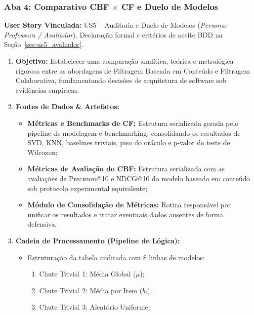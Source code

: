 \subsubsection{Aba 4: Comparativo CBF $\times$ CF e Duelo de Modelos}

\noindent\textbf{User Story Vinculada:} US5 -- Auditoria e Duelo de Modelos (\textit{Persona: Professora / Avaliador}).
Declaração formal e critérios de aceite BDD na Seção~\ref{sec:us5_avaliador}.

\begin{enumerate}[label=\textbf{\arabic*.}]
    \item \textbf{Objetivo:} Estabelecer uma comparação analítica, teórica e metrológica rigorosa entre as abordagens de Filtragem Baseada em Conteúdo e Filtragem Colaborativa, fundamentando decisões de arquitetura de software sob evidências empíricas.
    \item \textbf{Fontes de Dados \& Artefatos:}
    \begin{itemize}
        \item \textbf{Métricas e Benchmarks de CF:} Estrutura serializada gerada pelo pipeline de modelagem e benchmarking, consolidando os resultados de SVD, KNN, baselines triviais, piso do oráculo e p-valor do teste de Wilcoxon;
        \item \textbf{Métricas de Avaliação do CBF:} Estrutura serializada com as avaliações de Precision@10 e NDCG@10 do modelo baseado em conteúdo sob protocolo experimental equivalente;
        \item \textbf{Módulo de Consolidação de Métricas:} Rotina responsável por unificar os resultados e tratar eventuais dados ausentes de forma defensiva.
    \end{itemize}
    \item \textbf{Cadeia de Processamento (Pipeline de Lógica):}
    \begin{itemize}
        \item Estruturação da tabela auditada com 8 linhas de modelos:
        \begin{enumerate}[label=\roman*.]
            \item Chute Trivial 1: Média Global ($\mu$);
            \item Chute Trivial 2: Média por Item ($b_i$);
            \item Chute Trivial 3: Aleatório Uniforme;

\end{enumerate}
\end{itemize}
\end{enumerate}
